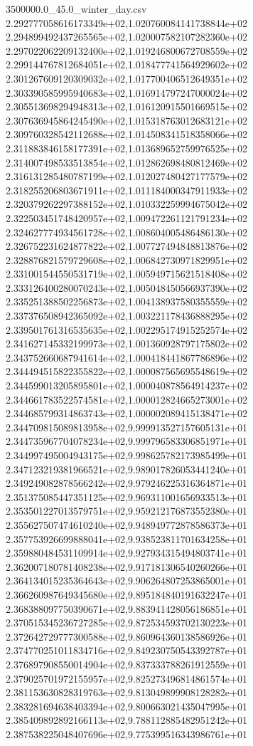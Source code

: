 \begin{filecontents*}{3500000.0_45.0_winter_day.csv}
2.292777058616173349e+02,1.020760084141738844e+02
2.294899492437265565e+02,1.020007582107282360e+02
2.297022062209132400e+02,1.019246800672708559e+02
2.299144767812684051e+02,1.018477741564929602e+02
2.301267609120309032e+02,1.017700406512649351e+02
2.303390585995940683e+02,1.016914797247000024e+02
2.305513698294948313e+02,1.016120915501669515e+02
2.307636945864245490e+02,1.015318763012683121e+02
2.309760328542112688e+02,1.014508341518358066e+02
2.311883846158177391e+02,1.013689652759976525e+02
2.314007498533513854e+02,1.012862698480812469e+02
2.316131285480787199e+02,1.012027480427177579e+02
2.318255206803671911e+02,1.011184000347911933e+02
2.320379262297388152e+02,1.010332259994675042e+02
2.322503451748420957e+02,1.009472261121791234e+02
2.324627774934561728e+02,1.008604005486486130e+02
2.326752231624877822e+02,1.007727494848813876e+02
2.328876821579729608e+02,1.006842730971829951e+02
2.331001544550531719e+02,1.005949715621518408e+02
2.333126400280070243e+02,1.005048450566937390e+02
2.335251388502256873e+02,1.004138937580355559e+02
2.337376508942365092e+02,1.003221178436888295e+02
2.339501761316535635e+02,1.002295174915252574e+02
2.341627145332199973e+02,1.001360928797175802e+02
2.343752660687941614e+02,1.000418441867786896e+02
2.344494515822355822e+02,1.000087565695548619e+02
2.344599013205895801e+02,1.000040878564914237e+02
2.344661783522574581e+02,1.000012824665273001e+02
2.344685799314863743e+02,1.000002089415138471e+02
2.344709815089813958e+02,9.999913527157605131e+01
2.344735967704078234e+02,9.999796583306851971e+01
2.344997495004943175e+02,9.998625782173985499e+01
2.347123219381966521e+02,9.989017826053441240e+01
2.349249082878566242e+02,9.979246225316364871e+01
2.351375085447351125e+02,9.969311001656933513e+01
2.353501227013579751e+02,9.959212176873552380e+01
2.355627507474610240e+02,9.948949772878586373e+01
2.357753926699888041e+02,9.938523811701634258e+01
2.359880484531109914e+02,9.927934315494803741e+01
2.362007180781408238e+02,9.917181306540260266e+01
2.364134015235364643e+02,9.906264807253865001e+01
2.366260987649345680e+02,9.895184840191632247e+01
2.368388097750390671e+02,9.883941428056186851e+01
2.370515345236727285e+02,9.872534593702130223e+01
2.372642729777300588e+02,9.860964360138586926e+01
2.374770251011834716e+02,9.849230750543392787e+01
2.376897908550014904e+02,9.837333788261912559e+01
2.379025701972155957e+02,9.825273496814861574e+01
2.381153630828319763e+02,9.813049899908128282e+01
2.383281694638403394e+02,9.800663021435047995e+01
2.385409892892166113e+02,9.788112885482951242e+01
2.387538225048407696e+02,9.775399516343986761e+01

\end{filecontents*}
